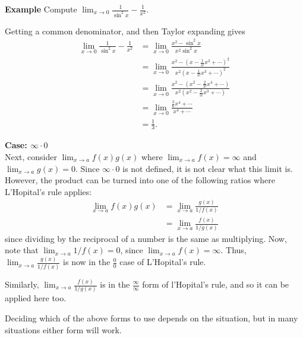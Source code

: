\documentclass[a4paper]{book}
\begin{document}
\begin{sloppypar}
\textbf{Example} Compute $\displaystyle \lim_{x \rightarrow 0} \frac{1}{\sin^2 x} - \frac{1}{x^2}$. 
\begin{examplebox}
Getting a common denominator, and then Taylor expanding gives
\begin{align*}
\lim_{x \rightarrow 0} \frac{1}{\sin^2x} - \frac{1}{x^2} &= \lim_{x\rightarrow 0} \frac{x^2 - \sin^2x}{x^2 \sin^2x } \\
&= \lim_{ x\rightarrow 0} \frac{x^2 - \left(x-\frac{1}{3!}x^3 + \dotsb \right)^2}{x^2 \left(x- \frac{1}{3!}x^3 + \dotsb\right)^2} \\
&= \lim_{x \rightarrow 0} \frac{x^2 - \left(x^2 - \frac{2}{3!}x^4 + \dotsb\right)}{x^2 \left(x^2 - \frac{2}{3!}x^3 + \dotsb\right)} \\
&= \lim_{x \rightarrow 0} \frac{\frac{2}{6}x^4 + \dotsb}{x^4 + \dotsb} \\
&= \frac{1}{3}.
\end{align*}
\end{examplebox}
\bigbreak
\noindent \textbf{Case: $\infty \cdot 0$}\\

Next, consider $\displaystyle \lim_{x \rightarrow a} f(x)g(x)$ where $\displaystyle \lim_{x \rightarrow a} f(x) = \infty$ and $\displaystyle \lim_{x \rightarrow a}g(x) = 0$. Since $\infty \cdot 0$ is not defined, it is not clear what this limit is. However, the product can be turned into one of the following ratios where L'Hopital's rule applies:
\begin{align*}
\lim_{x \rightarrow a} f(x)g(x) &= \lim_{x \rightarrow a} \frac{g(x)}{1/f(x)} \\
&= \lim_{x \rightarrow a} \frac{f(x)}{1/g(x)}
\end{align*}
since dividing by the reciprocal of a number is the same as multiplying. Now, note that $\displaystyle \lim_{x \rightarrow a} 1/f(x) = 0$, since $\displaystyle \lim_{x \rightarrow a} f(x) = \infty$. Thus, $ \displaystyle \lim_{x \rightarrow a} \frac{g(x)}{1/f(x)}$ is now in the $\frac{0}{0}$ case of L'Hopital's rule.

Similarly, $\displaystyle \lim_{x \rightarrow a} \frac{f(x)}{1/g(x)}$ is in the $\frac{\infty}{\infty}$ form of l'Hopital's rule, and so it can be applied here too.

Deciding which of the above forms to use depends on the situation, but in many situations either form will work.


\end{sloppypar}
\end{document}
